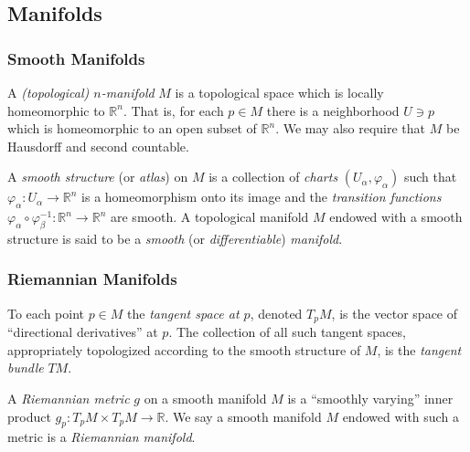 \documentclass{beamer}
\newcommand{\R}{\mathbb{R}}
\theoremstyle{definition}
\begin{document}
\subsection{Manifolds}

\begin{frame}
    \frametitle{Smooth Manifolds}

    \begin{definition}
        A \emph{(topological) $n$-manifold} $M$ is a topological space which is
        locally homeomorphic to $\R^n$. That is, for each $p \in M$ there is
        a neighborhood $U \ni p$ which is homeomorphic to an open subset of $\R^n$.
        We may also require that $M$ be Hausdorff and second countable.
    \end{definition}
    \begin{definition}
        A \emph{smooth structure} (or \emph{atlas}) on $M$ is a collection
        of \emph{charts} $(U_\alpha, \varphi_\alpha)$ such that
        $\varphi_\alpha : U_\alpha \to \R^n$ is a homeomorphism onto its image
        and the \emph{transition functions}
        $\varphi_\alpha \circ \varphi_\beta^{-1} : \R^n \to \R^n$
        are smooth. A topological manifold $M$ endowed with a smooth structure is
        said to be a \emph{smooth} (or \emph{differentiable}) \emph{manifold}.
    \end{definition}
\end{frame}

\begin{frame}
    \frametitle{Riemannian Manifolds}

    \begin{definition}
        To each point $p \in M$ the \emph{tangent space at $p$}, denoted $T_pM$,
        is the vector space of ``directional derivatives'' at $p$. The collection
        of all such tangent spaces, appropriately topologized according to the
        smooth structure of $M$, is the \emph{tangent bundle} $TM$.
    \end{definition}
    \begin{definition}
        A \emph{Riemannian metric} $g$ on a smooth manifold $M$ is a ``smoothly varying''
        inner product $g_p : T_pM \times T_pM \to \R$.
        We say a smooth manifold $M$ endowed with such a metric is a \emph{Riemannian manifold}.
    \end{definition}
\end{frame}
\end{document}
